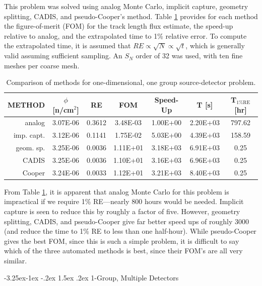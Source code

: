 \documentclass[letter,11pt]{article}
\makeatletter
\renewcommand\subsection{\@startsection{subsection}{2}{\z@}%
                                {-3.25ex\@plus -1ex \@minus -.2ex}%
                                {1.5ex \@plus .2ex}%
                                {\normalfont\itshape\bf}}
\makeatother
\begin{document}
This problem was solved using analog Monte Carlo, implicit capture, geometry splitting, CADIS, and pseudo-Cooper's method.  Table \ref{tbl:1gsd} provides for each method the figure-of-merit (FOM) for the track length flux estimate, the speed-up relative to analog, and the extrapolated time to 1\% relative error.  To compute the extrapolated time, it is assumed that $RE \propto \sqrt{N} \propto \sqrt{t}$, which is generally valid assuming sufficient sampling.  An $S_N$ order of 32 was used, with ten fine meshes per coarse mesh.

\begin{table}[th]
 \caption{Comparison of methods for one-dimensional, one group source-detector problem.}
 \begin{center} 
 {\small
 \begin{tabular*}{0.99\textwidth}{@{\extracolsep{\fill}} rcccccc } 
  \toprule 
   {\sc METHOD}  &  $\phi$ [n/cm$^2$]  &  {\sc RE} & {\sc FOM} &  {\sc Speed-Up} & {\sc T [s]} & {\sc T$_{\mathrm{1\% RE}}$ [hr]} \\
  \midrule 
   analog      & 3.07E-06 & 0.3612 & 3.48E-03 & 1.00E+00 & 2.20E+03 & 797.62 \\
   imp. capt.  & 3.12E-06 & 0.1141 & 1.75E-02 & 5.03E+00 & 4.39E+03 & 158.59 \\
   geom. sp.   & 3.25E-06 & 0.0036 & 1.11E+01 & 3.18E+03 & 6.91E+03 & 0.25 \\
   CADIS       & 3.25E-06 & 0.0036 & 1.10E+01 & 3.16E+03 & 6.96E+03 & 0.25 \\ 
   Cooper      & 3.24E-06 & 0.0033 & 1.12E+01 & 3.21E+03 & 8.40E+03 & 0.25 \\
  \bottomrule 
 \end{tabular*} 
 }
 \end{center} 
 \label{tbl:1gsd}  
\end{table}

From Table \ref{tbl:1gsd}, it is apparent that analog Monte Carlo for this problem is impractical if we require 1\% RE---nearly 800 hours would be needed.  Implicit capture is seen to reduce this by roughly a factor of five.  However, geometry splitting, CADIS, and pseudo-Cooper give far better speed ups of roughly 3000 (and reduce the time to 1\% RE to less than one half-hour).  While pseudo-Cooper gives the best FOM, since this is such a simple problem, it is difficult to say which of the three automated methods is best, since their FOM's are all very similar.


\subsection{1-Group, Multiple Detectors}
\end{document}
